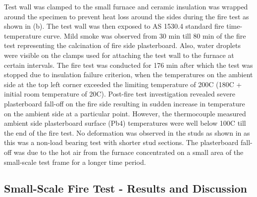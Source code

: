 Test wall was clamped to the small furnace and ceramic insulation was wrapped around the specimen to prevent heat loss around the sides during the fire test as shown in (b). The test wall was then exposed to AS 1530.4 standard fire time-temperature curve. Mild smoke was observed from 30 min till 80 min of the fire test representing the calcination of fire side plasterboard. Also, water droplets were visible on the clamps used for attaching the test wall to the furnace at certain intervals. The fire test was conducted for 176 min after which the test was stopped due to insulation failure criterion, when the temperatures on the ambient side at the top left corner exceeded the limiting temperature of 200\degree C (180\degree C + initial room temperature of 20\degree C). Post-fire test investigation  revealed severe plasterboard fall-off on the fire side resulting in sudden increase in temperature on the ambient side at a particular point. However, the thermocouple measured ambient side plasterboard surface (Pb4) temperatures were well below 100\degree C till the end of the fire test. No deformation was observed in the studs as shown in  as this was a non-load bearing test with shorter stud sections. The plasterboard fall-off was due to the hot air from the furnace concentrated on a small area of the small-scale test frame for a longer time period.

\subsection{Small-Scale Fire Test - Results and Discussion}

